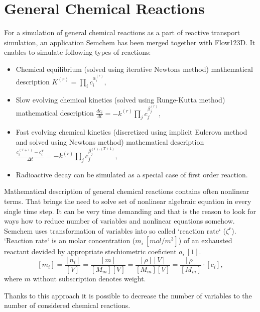 \section{General Chemical Reactions}
For a simulation of general chemical reactions as a part of reactive transport simulation, an application Semchem has been merged together with Flow123D. It enables to simulate following types of reactions:
\begin{itemize}
  \item Chemical equilibrium (solved using iterative Newtons method)
    \subitem mathematical description $K^{(r)} = \prod_i c_i^{\alpha_i^{(r)}},$

  \item Slow evolving chemical kinetics (solved using Runge-Kutta method)
    \subitem mathematical description $\frac{dc_i}{dt} = -k^{(r)}\prod_j c_j^{\beta_j^{(r)}},$

  \item Fast evolving chemical kinetics (discretized using implicit Eulerova method and solved using Newtons method)
     \subitem mathematical description $\frac{c_i^{(T+1)} - c_i^{T}}{\Delta t} = -k^{(r)}\prod_j c_j^{\beta_j^{(r),(T+1)}},$
  \item Radioactive decay can be simulated as a special case of first order reaction.
\end{itemize}

Mathematical description of general chemical reactions contains often nonlinear terms. That brings the need to solve set of nonlinear algebraic equation in every single time step. It can be very time demanding and that is the reason to look for ways how to reduce number of variables and nonlinear equations somehow.
Semchem uses transformation of variables into so called `reaction rate` ($\zeta^r$). `Reaction rate` is an molar concentration ($m_i~[mol/m^3]$) of an exhausted reactant devided by appropriate stechiometric coeficient $a_i~[1]$. 
\[
  [m_i] = \frac{[n_i]}{[V]} = \frac{[m]}{[M_m][V]} = \frac{[\rho][V]}{[M_m][V]} = \frac{[\rho]}{[M_m]}\cdot[c_i],
\]
where $m$ without subscription denotes weight.

Thanks to this approach it is possible to decrease the number of variables to the number of considered chemical reactions.

